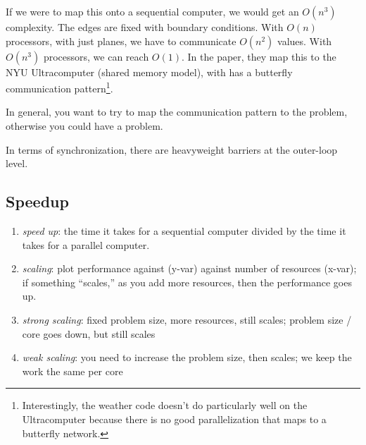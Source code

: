 If we were to map this onto a sequential computer, we would get an \( O(n^3) \) complexity.
The edges are fixed with boundary conditions. With \( O(n) \) processors, with just planes, we have to communicate \( O(n^2) \) values. With \( O(n^3) \) processors, we can reach \( O(1) \). In the paper, they map this to the NYU Ultracomputer (shared memory model), with has a butterfly communication pattern\footnote{Interestingly, the weather code doesn't do particularly well on the Ultracomputer because there is no good parallelization that maps to a butterfly network.}.

In general, you want to try to map the communication pattern to the problem, otherwise you could have a problem.

In terms of synchronization, there are heavyweight barriers at the outer-loop level.

\subsection{Speedup}
\begin{enumerate}
    \item \textit{speed up}: the time it takes for a sequential computer divided by the time it takes for a parallel computer.
    \item \textit{scaling}: plot performance against (y-var) against number of resources (x-var); if something ``scales,'' as you add more resources, then the performance goes up.
    \item \textit{strong scaling}: fixed problem size, more resources, still scales; problem size / core goes down, but still scales
    \item \textit{weak scaling}: you need to increase the problem size, then scales; we keep the work the same per core
\end{enumerate}


